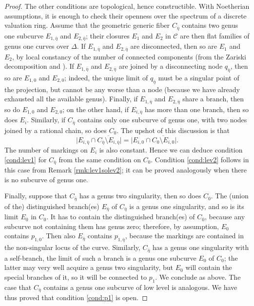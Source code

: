 \documentclass[11pt]{amsart}
\newcommand{\dvr}{\Delta}
\theoremstyle{plain}
\theoremstyle{definition}
\begin{document}
\begin{proof}
 The other conditions are topological, hence constructible. With Noetherian assumptions, it is enough to check their openness over the spectrum of a discrete valuation ring. Assume that the geometric generic fiber $C_{\bar\eta}$ contains two genus one subcurve $E_{1,\bar\eta}$ and $E_{2,\bar\eta}$; their closures $E_1$ and $E_2$ in $\mathcal C$ are then flat families of genus one curves over $\dvr$. If $E_{1,\bar\eta}$ and $E_{2,\bar\eta}$ are disconnected, then so are $E_1$ and $E_2$, by local constancy of the number of connected components (from the Zariski decomposition and \cite[\href{https://stacks.math.columbia.edu/tag/0E0D}{Tag 0E0D}]{stacks-project}). If $E_{1,\bar\eta}$ and $E_{2,\bar\eta}$ are joined by a disconnecting node $q_{\bar\eta}$, then so are $E_{1,0}$ and $E_{2,0}$; indeed, the unique limit of $q_{\bar\eta}$ must be a singular point of the projection, but cannot be any worse than a node (because we have already exhausted all the available genus). Finally, if $E_{1,\bar\eta}$ and $E_{2,\bar\eta}$ share a branch, then so do $E_{1,0}$ and $E_{2,0}$; on the other hand, if $E_{i,\bar\eta}$ has more than one branch, then so does $E_i$. Similarly, if $C_{\bar\eta}$ contains only one subcurve of genus one, with two nodes joined by a rational chain, so does $C_0$. The upshot of this discussion is that
 \[\lvert E_{i,\bar\eta}\cap\overline{C_{\bar\eta}\setminus E_{i,\bar\eta}}\rvert=\lvert E_{i,0}\cap\overline{C_{0}\setminus E_{i,0}}\rvert.\]
 The number of markings on $E_i$ is also constant. Hence we can deduce condition \eqref{cond:lev1} for $C_{\bar\eta}$ from the same condition on $C_0$. Condition \eqref{cond:lev2} follows in this case from Remark \ref{rmk:lev1solev2}; it can be proved analogously when there is no subcurve of genus one.
 
 Finally, suppose that $C_{\bar\eta}$ has a genus two singularity, then so does $C_0$. The (union of the) distinguished branch(es) $E_{\bar\eta}$ of $C_{\bar\eta}$ is a genus one singularity, and so is its limit $E_0$ in $C_0$. It has to contain the distinguished branch(es) of $C_0$, because any subcurve not containing them has genus zero; therefore, by assumption, $E_0$ contains $p_{1,0}$. Then also $E_{\bar\eta}$ contains $p_{1,\bar\eta}$, because the markings are contained in the non-singular locus of the curve. Similarly, $C_{\bar\eta}$ has a genus one singularity with a self-branch, the limit of such a branch is a genus one subcurve $E_0$ of $C_0$; the latter may very well acquire a genus two singularity, but $E_0$ will contain the special branches of it, so it will be connected to $p_1$. We conclude as above. The case that $C_{\bar\eta}$ contains a genus one subcurve of low level is analogous. We have thus proved that condition \ref{cond:p1} is open.
\end{proof}
\end{document}
